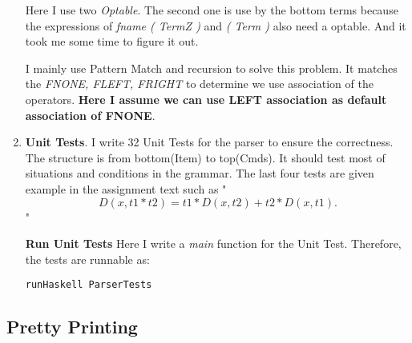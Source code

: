 \documentclass[11pt]{article}
\begin{document}
\begin{enumerate}
\begin{lstlisting}
\end{lstlisting}

Here I use two \textit{Optable}. The second one is use by the bottom terms because the expressions of \textit{fname ( TermZ )} and \textit{( Term )} also need a optable. And it took me some time to figure it out.

I mainly use Pattern Match and recursion to solve this problem. It matches the \textit{FNONE, FLEFT, FRIGHT} to determine we use association of the operators. \textbf{Here I assume we can use LEFT association as default association of FNONE}.


\item \textbf{Unit Tests}.
I write 32 Unit Tests for the parser to ensure the correctness. The structure is from bottom(Item) to top(Cmds). It should test most of situations and conditions in the grammar. The last four tests are given example in the assignment text such as "$$D(x,t1*t2) = t1*D(x,t2) + t2*D(x,t1).$$" 

\textbf{Run Unit Tests}
Here I write a \textit{main} function for the Unit Test. Therefore, the tests are runnable as:
\begin{verbatim}
runHaskell ParserTests
\end{verbatim}

\end{enumerate}

\subsection{Pretty Printing}
\end{document}
